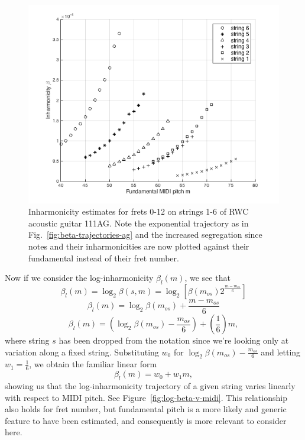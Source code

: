 \documentclass[12pt]{cmuthesis}
\begin{document}
\begin{figure}[h] 
\centering
\includegraphics[scale=0.7]{beta-v-midi}
\caption{Inharmonicity estimates for frets 0-12 on strings 1-6 of RWC acoustic guitar 111AG. Note the exponential trajectory as in Fig.~\ref{fig:beta-trajectories-ag} and the increased segregation since notes and their inharmonicities are now plotted against their fundamental instead of their fret number.}
\label{fig:beta-v-midi}
\end{figure}

Now if we consider the log-inharmonicity $\beta_{l}(m)$, we see that
\begin{equation}
\beta_l(m) = \log_2\beta(s,m) = \log_2[\beta(m_{os})2^{\frac{m-m_{os}}{6}}]
\end{equation}
\begin{equation}
\beta_l(m) = \log_2\beta(m_{os}) + \frac{m-m_{os}}{6}
\end{equation}
\begin{equation}
\beta_l(m) = (\log_2\beta(m_{os})-\frac{m_{os}}{6}) + (\frac{1}{6})m,
\end{equation}
where string $s$ has been dropped from the notation since we're looking only at variation along a fixed string. Substituting $w_0$ for $\log_2\beta(m_{os})-\frac{m_{os}}{6}$ and letting $w_1 = \frac{1}{6}$, we obtain the familiar linear form
\begin{equation}
\label{eq:linear-traj}
\beta_l(m) = w_0 + w_1m,
\end{equation}
showing us that the log-inharmonicity trajectory of a given string varies linearly with respect to MIDI pitch. See Figure~\ref{fig:log-beta-v-midi}. This relationship also holds for fret number, but fundamental pitch is a more likely and generic feature to have been estimated, and consequently is more relevant to consider here.
\end{document}
